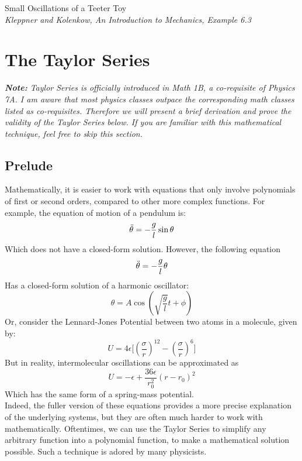 \documentclass[11pt]{article}
\theoremstyle{gangnamstyle}{\newtheorem{definition}{Definition}[]}
\theoremstyle{gangnamstyle}{\newtheorem{example}{Example}[]}
\theoremstyle{gangnamstyle}{\newtheorem{problem}{Problem}[]}
\theoremstyle{gangnamstyle}{\newtheorem{warning}{Warning}[]}
\begin{document}
\begin{example}
Small Oscillations of a Teeter Toy \\
\textit{Kleppner and Kolenkow, An Introduction to Mechanics, Example 6.3} \\


\end{example}

\pagebreak

\section{The Taylor Series}

\textit{\textbf{Note:} Taylor Series is officially introduced in Math 1B, a co-requisite of Physics 7A. I am aware that most physics classes outpace the corresponding math classes listed as co-requisites. Therefore we will present a brief derivation and prove the validity of the Taylor Series below. If you are familiar with this mathematical technique, feel free to skip this section.} 

\subsection{Prelude}

Mathematically, it is easier to work with equations that only involve polynomials of first or second orders, compared to other more complex functions. For example, the equation of motion of a pendulum is: 
\[ \Ddot{\theta} = -\frac{g}{l}\sin\theta \]
Which does not have a closed-form solution. However, the following equation
\[ \Ddot{\theta} = -\frac{g}{l}\theta \]
Has a closed-form solution of a harmonic oscillator: 
\[ \theta = A\cos(\sqrt{\frac{g}{l}}t + \phi) \]
Or, consider the Lennard-Jones Potential between two atoms in a molecule, given by:
\[ U = 4\epsilon\Big[ (\frac{\sigma}{r})^{12} - (\frac{\sigma}{r})^6 \Big] \]
But in reality, intermolecular oscillations can be approximated as
\[ U = -\epsilon + \frac{36\epsilon}{r_0^2}(r - r_0)^2 \]
Which has the same form of a spring-mass potential. \\

Indeed, the fuller version of these equations provides a more precise explanation of the underlying systems, but they are often much harder to work with mathematically. Oftentimes, we can use the Taylor Series to simplify any arbitrary function into a polynomial function, to make a mathematical solution possible. Such a technique is adored by many physicists. 
\end{document}
